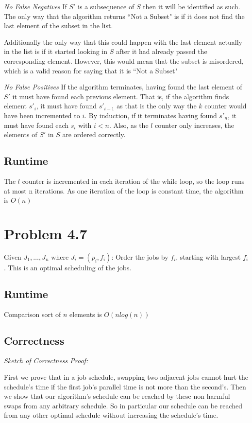 \documentclass{article}
\begin{document}
\emph{No False Negatives}
If $S'$ is a subsequence of $S$ then it will be identified as such. The only way that the algorithm returns ``Not a Subset" is if it does not find the last element of the subset in the list.

Additionally the only way that this could happen with the last element actually in the list is if it started looking in $S$ after it had already passed the corresponding element. However, this would mean that the subset is misordered, which is a valid reason for saying that it is ``Not a Subset"

\emph{No False Positives}
If the algorithm terminates, having found the last element of $S'$ it must have found each previous element. That is, if the algorithm finds element $s'_i$, it must have found $s'_{i-1}$ as that is the only way the $k$ counter would have been incremented to $i$. By induction, if it terminates having found $s'_n$, it must have found each $s_i$ with $i < n$. Also, as the $l$ counter only increases, the elements of $S'$ in $S$ are ordered correctly.


\subsection{Runtime}
The $l$ counter is incremented in each iteration of the while loop, so the loop runs at most n iterations. As one iteration of the loop is constant time, the algorithm is $O(n)$

\section{Problem 4.7}

Given $J_1, \dots , J_n$ where $J_i = (p_i, f_i)$: Order the jobs by $f_i$, starting with largest $f_i$. This is an optimal scheduling of the jobs.

\subsection{Runtime}
Comparison sort of $n$ elements is $O(n log(n))$

\subsection{Correctness}

\emph{Sketch of Correctness Proof: }

First we prove that in a job schedule, swapping two adjacent jobs cannot hurt the schedule's time if the first job's parallel time is not more than the second's.
Then we show that our algorithm's schedule can be reached by these non-harmful swaps from any arbitrary schedule. So in particular our schedule can be reached from any other optimal schedule without increasing the schedule's time.
\end{document}
